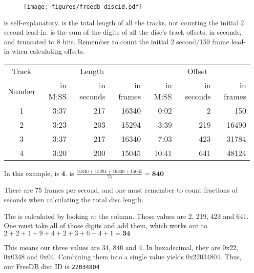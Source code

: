 \begin{figure}[h]
\texttt{[image: figures/freedb\_discid.pdf]}
\end{figure}
\par
\noindent
{} is self-explanatory.
 is the total length of all the tracks, not
counting the initial 2 second lead-in.
 is the sum of the digits of all
the disc's track offsets, in seconds, and truncated to 8 bits.
Remember to count the initial 2 second/150 frame lead-in when calculating
offsets.
\begin{table}[h]
\begin{tabular}{|c||r|r|r||r|r|r|}
\hline
Track & \multicolumn{3}{c||}{Length} & \multicolumn{3}{c|}{Offset} \\
Number & in M:SS & in seconds & in frames & in M:SS & in seconds & in frames \\
\hline
1 & 3:37 & 217 & 16340 & 0:02 & 2 & 150 \\
2 & 3:23 & 203 & 15294 & 3:39 & 219 & 16490 \\
3 & 3:37 & 217 & 16340 & 7:03 & 423 & 31784 \\
4 & 3:20 & 200 & 15045 & 10:41 & 641 & 48124 \\
\hline
\end{tabular}
\end{table}
\par
\noindent
In this example,  is \textbf{4}.
 is
$\frac{16340 + 15294 + 16340 + 15045}{75} = \textbf{840}$

There are 75 frames per second, and one must remember to count
fractions of seconds when calculating the total disc length.

The  is calculated by looking at the
 column.
Those values are 2, 219, 423 and 641.
One must take all of those digits and add them, which works out to
$2 + 2 + 1 + 9 + 4 + 2 + 3 + 6 + 4 + 1 = \textbf{34}$

This means our three values are 34, 840 and 4.
In hexadecimal, they are 0x22, 0x0348 and 0x04.
Combining them into a single value yields 0x22034804.
Thus, our FreeDB disc ID is \texttt{22034804}

